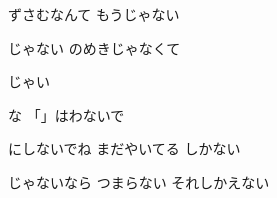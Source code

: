 \documentclass[a4paper,tate,twocolumn,12pt]{ltjtarticle}
\begin{document}
\begin{flushleft}
\begin{minipage}{\linewidth}
ずさむなんて もうじゃない

じゃない のめきじゃなくて

じゃい

な 「」はわないで

にしないでね まだやいてる しかない

じゃないなら つまらない それしかえない
\end{minipage}

\end{flushleft}
\end{document}
